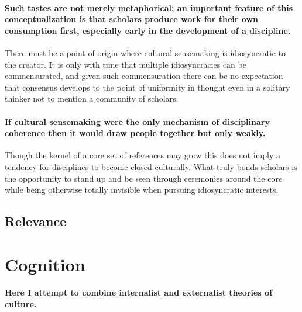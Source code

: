 \documentclass[]{article}
\begin{document}
\paragraph{Such tastes are not merely metaphorical; an important feature
of this conceptualization is that scholars produce work for their own
consumption first, especially early in the development of a
discipline.}\label{such-tastes-are-not-merely-metaphorical-an-important-feature-of-this-conceptualization-is-that-scholars-produce-work-for-their-own-consumption-first-especially-early-in-the-development-of-a-discipline.}

There must be a point of origin where cultural sensemaking is
idiosyncratic to the creator. It is only with time that multiple
idiosyncracies can be commensurated, and given such commensuration there
can be no expectation that consensus develops to the point of uniformity
in thought even in a solitary thinker not to mention a community of
scholars.

\paragraph{If cultural sensemaking were the only mechanism of
disciplinary coherence then it would draw people together but only
weakly.}\label{if-cultural-sensemaking-were-the-only-mechanism-of-disciplinary-coherence-then-it-would-draw-people-together-but-only-weakly.}

Though the kernel of a core set of references may grow this does not
imply a tendency for disciplines to become closed culturally. What truly
bonds scholars is the opportunity to stand up and be seen through
ceremonies around the core while being otherwise totally invisible when
pursuing idiosyncratic interests.

\subsection{Relevance}\label{relevance}

\section{Cognition}\label{cognition}

\paragraph{Here I attempt to combine internalist and externalist
theories of
culture.}\label{here-i-attempt-to-combine-internalist-and-externalist-theories-of-culture.}
\end{document}
